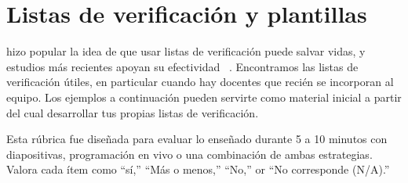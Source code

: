 \chapter{Listas de verificación y plantillas}\label{s:checklist}

\cite{Gawa2007} hizo popular la idea de que usar listas de verificación puede salvar vidas,
y estudios más recientes apoyan su efectividad ~\cite{Avel2013,Urba2014,Rams2019}.
Encontramos las listas de verificación útiles,
en particular cuando hay docentes que recién se incorporan al equipo.
Los ejemplos a continuación pueden servirte como material inicial a partir del cual desarrollar tus propias listas de verificación.


Esta rúbrica fue diseñada para evaluar lo enseñado durante 5 a 10 minutos
con diapositivas, programación en vivo o una combinación de ambas estrategias.
Valora cada ítem como ``sí,'' ``Más o menos,'' ``No,'' or ``No corresponde (N/A).''

